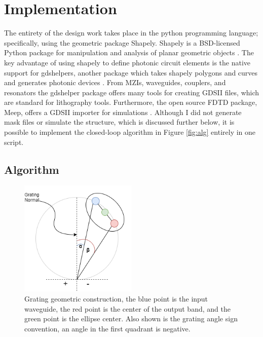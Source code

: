 \documentclass{article}
\begin{document}
\section{Implementation}
    The entirety of the design work takes place in the python programming language; specifically, using the geometric package Shapely. Shapely is a BSD-licensed Python package for manipulation and analysis of planar geometric objects \cite{ShapelyDocumentation}. The key advantage of using shapely to define photonic circuit elements is the native support for gdshelpers, another package which takes shapely polygons and curves and generates photonic devices \cite{WelcomeDocumentation}. From MZIs, waveguides, couplers, and resonators the gdshelper package offers many tools for creating GDSII files, which are standard for lithography tools. Furthermore, the open source FDTD package, Meep, offers a GDSII importer for simulations \cite{ManualDocumentation}. Although I did not generate mask files or simulate the structure, which is discussed further below, it is possible to implement the closed-loop algorithm in Figure \ref{fig:alg} entirely in one script.

    
    
    \subsection{Algorithm}
    
    \begin{figure}[H]        
    \centering
    \scriptsize 
    \includegraphics[width=0.5\textwidth]{images/grating_construction.png}
    \caption{\label{fig:grating_angles} Grating geometric construction, the blue point is the input waveguide, the red point is the center of the output band, and the green point is the ellipse center. Also shown is the grating angle sign convention, an angle in the first quadrant is negative.}
    \end{figure}
    
\end{document}
